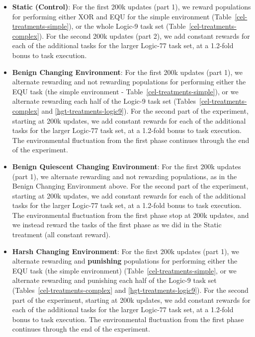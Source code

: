 \documentclass[PhD]{msu-thesis}
\begin{document}
\begin{itemize}
	\item \textbf{Static (Control)}: For the first 200k updates (part 1), we reward populations for performing either XOR and EQU for the simple environment (Table~\ref{cel-treatments-simple}), or the whole Logic-9 task set (Table~\ref{cel-treatments-complex}). For the second 200k updates (part 2), we add constant rewards for each of the additional tasks for the larger Logic-77 task set, at a 1.2-fold bonus to task execution.

	\item \textbf{Benign Changing Environment}: For the first 200k updates (part 1), we alternate rewarding and not rewarding populations for performing either the EQU task (the simple environment - Table~\ref{cel-treatments-simple}), or we alternate rewarding each half of the Logic-9 task set (Tables~\ref{cel-treatments-complex} and \ref{hgt-treatments-logic9}). For the second part of the experiment, starting at 200k updates, we add constant rewards for each of the additional tasks for the larger Logic-77 task set, at a 1.2-fold bonus to task execution. The environmental fluctuation from the first phase continues through the end of the experiment.

	\item \textbf{Benign Quiescent Changing Environment}: For the first 200k updates (part 1), we alternate rewarding and not rewarding populations, as in the Benign Changing Environment above. For the second part of the experiment, starting at 200k updates, we add constant rewards for each of the additional tasks for the larger Logic-77 task set, at a 1.2-fold bonus to task execution. The environmental fluctuation from the first phase stop at 200k updates, and we instead reward the tasks of the first phase as we did in the Static treatment (all constant reward).

	\item \textbf{Harsh Changing Environment}: For the first 200k updates (part 1), we alternate rewarding and \textbf{punishing} populations for performing either the EQU task (the simple environment) (Table~\ref{cel-treatments-simple}, or we alternate rewarding and punishing each half of the Logic-9 task set (Tables~\ref{cel-treatments-complex} and \ref{hgt-treatments-logic9}). For the second part of the experiment, starting at 200k updates, we add constant rewards for each of the additional tasks for the larger Logic-77 task set, at a 1.2-fold bonus to task execution. The environmental fluctuation from the first phase continues through the end of the experiment.


\end{itemize}
\end{document}
